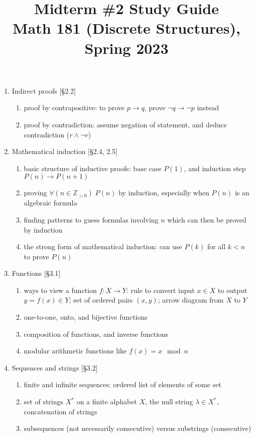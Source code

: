 \documentclass[11pt]{article}
\title{Midterm \#2 Study Guide \\Math 181 (Discrete Structures), Spring 2023}
\date{}
\begin{document}
\maketitle

\thispagestyle{empty}

\vspace{-1cm}

\begin{enumerate}
\item Indirect proofs [\S2.2] 
\begin{enumerate}
\item proof by contrapositive: to prove $p \to q$, prove $\neg q \to \neg p$ instead
\item proof by contradiction: assume negation of statement, and deduce contradiction ($r \wedge \neg r$)
\end{enumerate}

\item Mathematical induction [\S2.4, 2.5]
\begin{enumerate}
\item basic structure of inductive proofs: base case $P(1)$, and induction step $P(n) \to P(n+1)$
\item proving $\forall (n \in \mathbb{Z}_{>0}) \; P(n)$ by induction, especially when $P(n)$ is an algebraic formula
\item finding patterns to guess formulas involving $n$ which can then be proved by induction
\item the strong form of mathematical induction: can use $P(k)$ for all $k < n$ to prove $P(n)$
\end{enumerate}

\item Functions [\S3.1]
\begin{enumerate}
\item ways to view a function $f\colon X \to Y$: rule to convert input $x\in X$ to output $y=f(x)\in Y$; set of ordered pairs $(x,y)$; arrow diagram from $X$ to $Y$
\item one-to-one, onto, and bijective functions
\item composition of functions, and inverse functions
\item modular arithmetic functions like $f(x) = x \mod n$
\end{enumerate}

\item Sequences and strings [\S3.2]
\begin{enumerate}
\item finite and infinite sequences: ordered list of elements of some set
\item set of strings $X^*$ on a finite alphabet $X$, the null string $\lambda \in X^*$, concatenation of strings
\item subsequences (not necessarily consecutive) versus substrings (consecutive)
\end{enumerate}


\end{enumerate}
\end{document}
